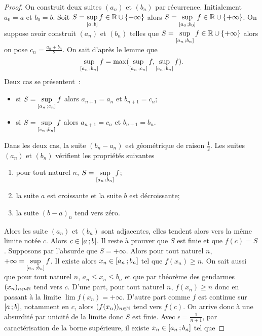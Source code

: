 \begin{proof}
  On construit deux suites \((a_n)\) et \((b_n)\) par récurrence. Initialement \(a_0=a\) et \(b_0=b\). Soit \(S=\sup\limits_{\left[ a \, ;  b \right]}f \in \mathbb{R}\cup\{+\infty\}\) alors \(S=\sup\limits_{\left[ a_0 \, ;  b_0 \right]}f \in \mathbb{R}\cup\{+\infty\}\). On suppose avoir construit \((a_n)\) et \((b_n)\) telles que \(S=\sup\limits_{\left[ a_n \, ;  b_n \right]}f \in \mathbb{R}\cup\{+\infty\}\) alors on pose \(c_n=\frac{a_n+b_n}{2}\). On sait d'après le lemme que 
  \begin{equation}
    \sup\limits_{\left[ a_n \, ;  b_n \right]}f=\max(\sup\limits_{\left[ a_n \, ;  c_n \right]}f,\sup\limits_{\left[ c_n \, ;  b_n \right]}f).
  \end{equation}
  Deux cas se présentent~:
  \begin{itemize}
  \item si \(S=\sup\limits_{\left[ a_n \, ;  c_n \right]}f\) alors \(a_{n+1}=a_n\) et \(b_{n+1}=c_n\);
  \item si \(S=\sup\limits_{\left[ c_n \, ;  b_n \right]}f\) alors \(a_{n+1}=c_n\) et \(b_{n+1}=b_n\).
  \end{itemize}
  Dans les deux cas, la suite \((b_n-a_n)\) est géométrique de raison \(\frac{1}{2}\). Les suites \((a_n)\) et \((b_n)\) vérifient les propriétés suivantes
  \begin{enumerate}
  \item pour tout naturel \(n\), \(S=\sup\limits_{\left[ a_n \, ;  b_n \right]}f\);
  \item la suite \(a\) est croissante et la suite \(b\) est décroissante;
  \item la suite \((b-a)_n\) tend vers zéro.
  \end{enumerate}
  Alors les suite \((a_n)\) et \((b_n)\) sont adjacentes, elles tendent alors vers la même limite notée \(c\). Alors \(c \in \left[ a \, ;  b \right]\). Il reste à prouver que \(S\) est finie et que \(f(c)=S\). Supposons par l'absurde que \(S=+\infty\). Alors pour tout naturel \(n\), \(+\infty = \sup\limits_{\left[ a_n \, ;  b_n \right]}f\). Il existe alors \(x_n \in \left[ a_n \, ;  b_n \right]\) tel que \(f(x_n) \geqslant n\). On sait aussi que pour tout naturel \(n\), \(a_n \leqslant x_n \leqslant b_n\) et que par théorème des gendarmes \((x_n)_{n _in \mathbb{N}}\) tend vers \(c\). D'une part, pour tout naturel \(n\), \(f(x_n) \geqslant n\) donc en passant à la limite \(\lim f(x_n) = +\infty\). D'autre part comme \(f\) est continue sur \(\left[ a \, ;  b \right]\), notamment en \(c\), alors \((f(x_n))_{n\in \mathbb{N}}\) tend vers \(f(c)\). On arrive donc à une absurdité par unicité de la limite donc \(S\) est finie. Avec \(\epsilon=\frac{1}{n+1}\), par caractérisation de la borne supérieure, il existe \(x_n \in \left[ a_n \, ;  b_n \right]\) tel que

\end{proof}

